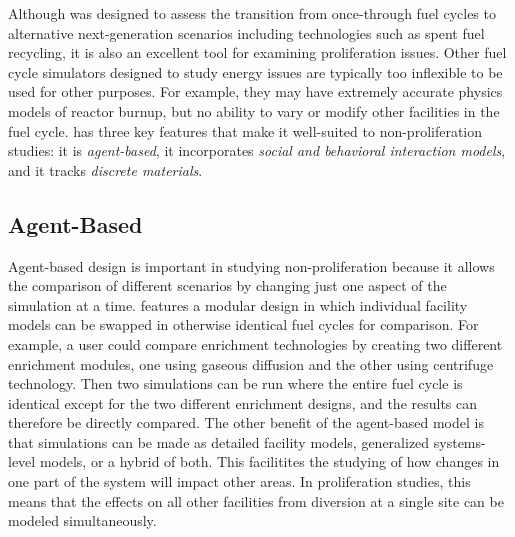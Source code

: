 Although \Cyclus was designed to assess the transition from once-through fuel cycles to alternative next-generation scenarios including technologies such as spent fuel recycling, it is also an excellent tool for examining proliferation issues.  Other fuel cycle simulators designed to study energy issues are typically too inflexible to be used for other purposes. For example, they may have extremely accurate physics models of reactor burnup, but no ability to vary or modify other facilities in the fuel cycle.  \Cyclus has three key features that make it well-suited to non-proliferation studies: it is \textit{agent-based}, it incorporates \textit{social and behavioral interaction models}, and it tracks \textit{discrete materials}.

\subsection{Agent-Based}
Agent-based design is important in studying non-proliferation because it allows the comparison of different scenarios by changing just one aspect of the simulation at a time.  \Cyclus features a modular design in which individual facility models can be swapped in otherwise identical fuel cycles for comparison. For example, a user could compare enrichment technologies by creating two different enrichment modules, one using gaseous diffusion and the other using centrifuge technology. Then two simulations can be run where the entire fuel cycle is identical except for the two different enrichment designs, and the results can therefore be directly compared. The other benefit of the agent-based model is that simulations can be made as detailed facility models, generalized systems-level models, or a hybrid of both. This facilitites the studying of how changes in one part of the system will impact other areas.  In proliferation studies, this means that the effects on all other facilities from diversion at a single site can be modeled simultaneously.

